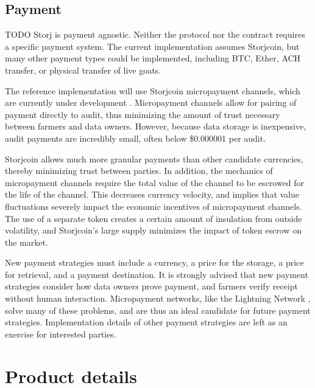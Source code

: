 \documentclass[a4paper,10pt]{article}
\newcommand{\todo}[1]{{\color{red} TODO #1}}
\begin{document}
\subsection{Payment}

\todo{
Storj is payment agnostic. Neither the protocol nor the contract requires a
specific payment system. The current implementation assumes Storjcoin, but many
other payment types could be implemented, including BTC, Ether, ACH transfer, or
physical transfer of live goats.

The reference implementation will use Storjcoin micropayment channels, which are
currently under development \cite{26}. Micropayment channels allow for pairing
of payment directly to audit, thus minimizing the amount of trust necessary
between farmers and data owners. However, because data storage is inexpensive,
audit payments are incredibly small, often below \$0.000001 per audit.

Storjcoin allows much more granular payments than other candidate currencies,
thereby minimizing trust between parties. In addition, the mechanics of
micropayment channels require the total value of the channel to be escrowed for
the life of the channel. This decreases currency velocity, and implies that
value fluctuations severely impact the economic incentives of micropayment
channels. The use of a separate token creates a certain amount of insulation
from outside volatility, and Storjcoin's large supply minimizes the impact of
token escrow on the market.

New payment strategies must include a currency, a price for the storage, a price
for retrieval, and a payment destination. It is strongly advised that new
payment strategies consider how data owners prove payment, and farmers verify
receipt without human interaction. Micropayment networks, like the Lightning
Network \cite{25}, solve many of these problems, and are thus an ideal candidate
for future payment strategies. Implementation details of other payment
strategies are left as an exercise for interested parties.
}

\section{Product details}
\end{document}
